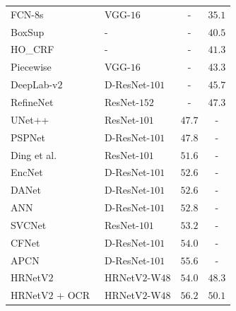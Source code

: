 \documentclass[10pt,journal,compsoc]{IEEEtran}
\begin{document}
\begin{table}[t]
\begin{tabular}{l@{~~~~}|@{~~~~}l@{~~~~}|@{~~~~}c@{~~~~}c}
		\hline
		FCN-$8$s~\cite{ShelhamerLD17} & VGG-$16$ & - & $35.1$ \\
		BoxSup~\cite{DaiHS15} & - & - & $40.5$ \\
		HO\_CRF~\cite{ArnabJ0T16} & - & - & $41.3$ \\
		Piecewise~\cite{LinSHR16} & VGG-$16$ & - &$43.3$ \\
		DeepLab-v$2$~\cite{ChenPKMY18} & D-ResNet-$101$ & -& $45.7$ \\
		RefineNet~\cite{LinMSR17} & ResNet-$152$ & - & $47.3$ \\
		UNet++~\cite{ZhouSTL18} & ResNet-$101$ & $47.7$ & - \\
		PSPNet~\cite{ZhaoSQWJ17} & D-ResNet-$101$ & $47.8$ & - \\
		Ding et al.~\cite{DingJSL018} & ResNet-$101$ & $51.6$ & - \\
		EncNet~\cite{0005DSZWTA18} & D-ResNet-$101$ & $52.6$ & - \\
		DANet~\cite{FuLYL19} & D-ResNet-$101$ & $52.6$ & - \\
		ANN~\cite{ZhuXBHB2019} & D-ResNet-$101$ & $52.8$ & - \\
		SVCNet~\cite{DingJSLW19} & ResNet-$101$ & $53.2$ & - \\
		CFNet~\cite{ZhangZWX} & D-ResNet-$101$ & ${54.0}$ & - \\
		\hline
		APCN~\cite{HeDZWQ} & D-ResNet-$101$ & 
		$55.6$
		& - \\
		\hline
		HRNetV$2$ & HRNetV$2$-W$48$ &  ${54.0}$ & $48.3$ \\
		HRNetV$2$ + OCR~\cite{YuanCW18} & HRNetV$2$-W$48$ &  $\mathbf{56.2}$ & $\mathbf{50.1}$ \\
		\hline
	\end{tabular} 
	\vspace{-.2cm}
	\end{table}
\end{document}
